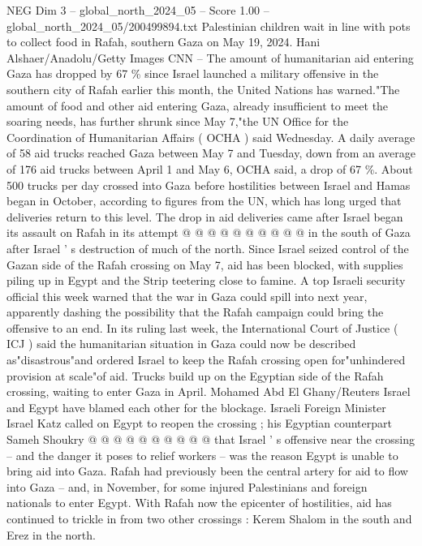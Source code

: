 \begin{textsample}{NEG Dim 3 – global\_north\_2024\_05 – Score 1.00 – global\_north\_2024\_05/200499894.txt}  \label{ex:f3_neg_442}
Palestinian children wait in line with pots to collect food in Rafah, southern Gaza on May 19, 2024.
Hani Alshaer/Anadolu/Getty Images CNN -- The amount of humanitarian aid entering Gaza has dropped by 67 \% since Israel launched a military offensive in the southern city of Rafah earlier this month, the United Nations has warned."The amount of food and other aid entering Gaza, already insufficient to meet the soaring needs, has further shrunk since May 7,"the UN Office for the Coordination of Humanitarian Affairs ( OCHA ) said Wednesday.
A daily average of 58 aid trucks reached Gaza between May 7 and Tuesday, down from an average of 176 aid trucks between April 1 and May 6, OCHA said, a drop of 67 \%.
About 500 trucks per day crossed into Gaza before hostilities between Israel and Hamas began in October, according to figures from the UN, which has long urged that deliveries return to this level.
The drop in aid deliveries came after Israel began its assault on Rafah in its attempt @ @ @ @ @ @ @ @ @ @ in the south of Gaza after Israel ' s destruction of much of the north.
Since Israel seized control of the Gazan side of the Rafah crossing on May 7, aid has been blocked, with supplies piling up in Egypt and the Strip teetering close to famine.
A top Israeli security official this week warned that the war in Gaza could spill into next year, apparently dashing the possibility that the Rafah campaign could bring the offensive to an end.
In its ruling last week, the International Court of Justice ( ICJ ) said the humanitarian situation in Gaza could now be described as"disastrous"and ordered Israel to keep the Rafah crossing open for"unhindered provision at scale"of aid.
Trucks build up on the Egyptian side of the Rafah crossing, waiting to enter Gaza in April.
Mohamed Abd El Ghany/Reuters Israel and Egypt have blamed each other for the blockage.
Israeli Foreign Minister Israel Katz called on Egypt to reopen the crossing ; his Egyptian counterpart Sameh Shoukry @ @ @ @ @ @ @ @ @ @ that Israel ' s offensive near the crossing -- and the danger it poses to relief workers -- was the reason Egypt is unable to bring aid into Gaza.
Rafah had previously been the central artery for aid to flow into Gaza -- and, in November, for some injured Palestinians and foreign nationals to enter Egypt.
With Rafah now the epicenter of hostilities, aid has continued to trickle in from two other crossings : Kerem Shalom in the south and Erez in the north.

\end{textsample}
